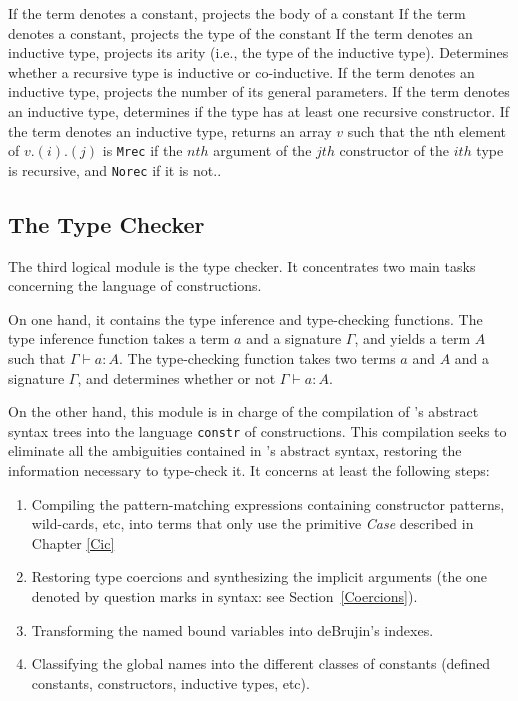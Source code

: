 \begin{description}
    {If the term denotes a constant, projects the body of a constant}
    {If the term denotes a constant, projects the type of the constant}
    {If the term denotes an inductive type, projects its arity (i.e.,
     the type of the inductive type).}
    {Determines whether a recursive type is inductive or co-inductive.}
    {If the term denotes an inductive type, projects the number of 
     its general parameters.}
    {If the term denotes an inductive type, 
     determines if the type has at least one recursive constructor. }
    {If the term denotes an inductive type, returns an array $v$ such 
     that the nth element of $v.(i).(j)$ is
    \texttt{Mrec} if the $nth$ argument of the $jth$ constructor of
    the $ith$ type is recursive, and \texttt{Norec} if it is not.}.
\end{description}

\subsection[The Type Checker]{The Type Checker\label{TypeChecker}}

The third logical module is the type checker. It concentrates two main
tasks concerning the language of constructions.

On one hand, it contains the type inference and type-checking
functions.  The type inference function takes a term
$a$ and a signature $\Gamma$, and yields a term $A$ such that
$\Gamma \vdash a:A$.  The type-checking function takes two terms $a$
and $A$ and a signature $\Gamma$, and determines whether or not
$\Gamma \vdash a:A$.

On the other hand, this module is in charge of the compilation of
\Coq's abstract syntax trees into the language \texttt{constr} of
constructions. This compilation seeks to eliminate all the ambiguities
contained in \Coq's abstract syntax, restoring the information
necessary to type-check it.  It concerns at least the following steps:
\begin{enumerate}
\item Compiling the pattern-matching expressions containing 
constructor patterns, wild-cards, etc, into terms that only
use the primitive \textsl{Case} described in Chapter \ref{Cic}
\item Restoring type coercions and synthesizing the implicit arguments
(the one denoted by question marks in
{\Coq} syntax: see Section~\ref{Coercions}).
\item Transforming the named bound variables into deBrujin's indexes.
\item Classifying the global names into the different classes of
constants (defined constants, constructors, inductive types, etc).
\end{enumerate}


